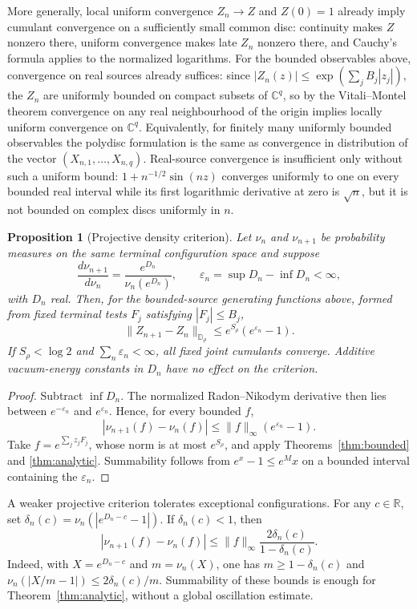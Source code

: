 \documentclass[11pt]{article}
\newtheorem{proposition}[theorem]{Proposition}
\theoremstyle{definition}
\theoremstyle{remark}
\newcommand{\D}{\mathbb D}
\newcommand{\C}{\mathbb C}
\begin{document}
More generally, local uniform convergence $Z_n\to Z$ and $Z(0)=1$ already imply
cumulant convergence on a sufficiently small common disc: continuity makes $Z$
nonzero there, uniform convergence makes late $Z_n$ nonzero there, and Cauchy's
formula applies to the normalized logarithms.  For the bounded observables
above, convergence on real sources already suffices: since
$|Z_n(z)|\le\exp(\sum_jB_j|z_j|)$, the $Z_n$ are uniformly bounded on compact
subsets of $\C^q$, so by the Vitali--Montel theorem convergence on any real
neighbourhood of the origin implies locally uniform convergence on $\C^q$.
Equivalently, for finitely many uniformly bounded observables the polydisc
formulation is the same as convergence in distribution of the vector
$(X_{n,1},\ldots,X_{n,q})$.  Real-source convergence is insufficient only
without such a uniform bound: $1+n^{-1/2}\sin(nz)$ converges uniformly to one
on every bounded real interval while its first logarithmic derivative at zero
is $\sqrt n$, but it is not bounded on complex discs uniformly in $n$.

\begin{proposition}[Projective density criterion]\label{prop:projective}
Let $\nu_n$ and $\nu_{n+1}$ be probability measures on the same terminal
configuration space and suppose
\[
 \frac{d\nu_{n+1}}{d\nu_n}
 =\frac{e^{D_n}}{\nu_n(e^{D_n})},
 \qquad
 \varepsilon_n=\sup D_n-\inf D_n<\infty,
\]
with $D_n$ real.  Then, for the bounded-source generating functions above,
formed from fixed terminal tests $F_j$ satisfying $|F_j|\le B_j$,
\[
 \lVert Z_{n+1}-Z_n\rVert_{\D_\rho}
 \le e^{S_\rho}(e^{\varepsilon_n}-1).
\]
If $S_\rho<\log2$ and $\sum_n\varepsilon_n<\infty$, all fixed joint cumulants
converge.  Additive vacuum-energy constants in $D_n$ have no effect on the
criterion.
\end{proposition}

\begin{proof}
Subtract $\inf D_n$.  The normalized Radon--Nikodym derivative then lies between
$e^{-\varepsilon_n}$ and $e^{\varepsilon_n}$.  Hence, for every bounded $f$,
\[
 |\nu_{n+1}(f)-\nu_n(f)|
 \le\lVert f\rVert_\infty(e^{\varepsilon_n}-1).
\]
Take $f=e^{\sum_jz_jF_j}$, whose norm is at most $e^{S_\rho}$, and apply
Theorems~\ref{thm:bounded} and \ref{thm:analytic}.  Summability follows from
$e^x-1\le e^M x$ on a bounded interval containing the $\varepsilon_n$.
\end{proof}

A weaker projective criterion tolerates exceptional configurations.  For any
$c\in\mathbb R$, set
$\delta_n(c)=\nu_n(|e^{D_n-c}-1|)$.  If $\delta_n(c)<1$, then
\[
 |\nu_{n+1}(f)-\nu_n(f)|
 \le \lVert f\rVert_\infty
      \frac{2\delta_n(c)}{1-\delta_n(c)}.
\]
Indeed, with $X=e^{D_n-c}$ and $m=\nu_n(X)$, one has
$m\ge1-\delta_n(c)$ and
$\nu_n(|X/m-1|)\le2\delta_n(c)/m$.  Summability of these bounds is enough for
Theorem~\ref{thm:analytic}, without a global oscillation estimate.
\end{document}

